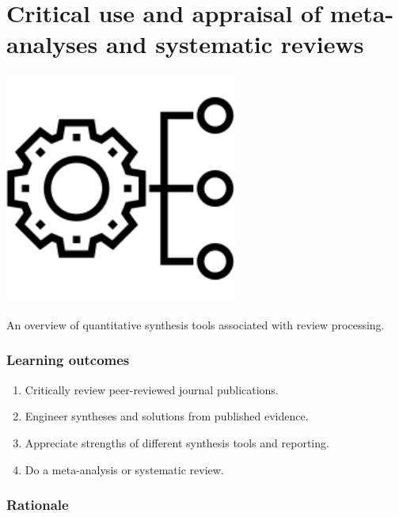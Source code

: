 \documentclass[
]{book}
\author{cjlortie}
\date{}
\providecommand{\tightlist}{%
  \setlength{\itemsep}{0pt}\setlength{\parskip}{0pt}}
\begin{document}
{
\setcounter{tocdepth}{1}
\tableofcontents
}
\hypertarget{critical-use-and-appraisal-of-meta-analyses-and-systematic-reviews}{%
\chapter{Critical use and appraisal of meta-analyses and systematic reviews}\label{critical-use-and-appraisal-of-meta-analyses-and-systematic-reviews}}

\includegraphics[width=3in,height=\textheight]{./synthesis.png}

An overview of quantitative synthesis tools associated with review processing.

\hypertarget{learning-outcomes}{%
\subsection*{Learning outcomes}\label{learning-outcomes}}

\begin{enumerate}
\def\labelenumi{\arabic{enumi}.}
\tightlist
\item
  Critically review peer-reviewed journal publications.\\
\item
  Engineer syntheses and solutions from published evidence.\\
\item
  Appreciate strengths of different synthesis tools and reporting.\\
\item
  Do a meta-analysis or systematic review.
\end{enumerate}

\hypertarget{rationale}{%
\subsection*{Rationale}\label{rationale}}
\end{document}
